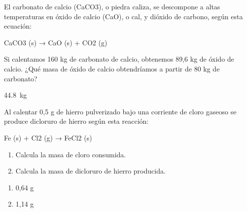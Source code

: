 \begin{exercise}
    El carbonato de calcio (CaCO3), o piedra caliza,
    se descompone a altas temperaturas en óxido
    de calcio (CaO), o cal, y dióxido de carbono,
    según esta ecuación:
    \begin{reaction*}
        CaCO3 (s) → CaO (s) + CO2 (g)
    \end{reaction*}
    Si calentamos 160 kg de carbonato de calcio,
    obtenemos 89,6 kg de óxido de calcio. ¿Qué masa de
    óxido de calcio obtendríamos a partir de 80 kg de
    carbonato?
    \begin{solu}
        \qty{44.8}{\kg}
    \end{solu}
\end{exercise}

\begin{exercise}
    Al calentar 0,5 g de hierro pulverizado bajo una corriente
    de cloro gaseoso se produce dicloruro de hierro
    según esta reacción:
    \begin{reaction*}
        Fe (s) + Cl2 (g) → FeCl2 (s)
    \end{reaction*}
    \begin{enumerate}[label=\letraminuscula]
        \item Calcula la masa de cloro consumida.
        \item Calcula la masa de dicloruro de hierro
        producida.
    \end{enumerate}
    \begin{solu}
        \begin{enumerate}[label=\letraminuscula]
            \item 0,64 g
            \item 1,14 g
        \end{enumerate}
    \end{solu}
\end{exercise}

